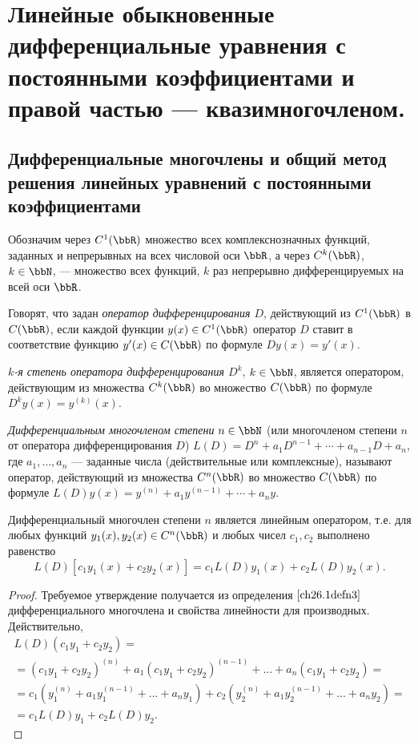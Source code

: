 \chapter{Линейные обыкновенные дифференциальные уравнения с постоянными коэффициентами и правой частью — квазимногочленом.}
\section{Дифференциальные многочлены и общий метод решения линейных уравнений с постоянными коэффициентами}
Обозначим через $C^1(\bbR)$ множество всех комплекснозначных функций, заданных и непрерывных на всех числовой оси $\bbR$, а через $C^k(\bbR)$, $k\in \bbN$, --- множество всех функций, $k$ раз непрерывно дифференцируемых на всей оси $\bbR$.
\begin{defn} \label{ch26.1defn1}
Говорят, что задан \textit{оператор дифференцирования $D$}, действующий из $C^1(\bbR)$ в $C(\bbR)$, если каждой функции $y(x)\in C^1(\bbR)$ оператор $D$ ставит в соответствие функцию $y'(x) \in C(\bbR)$ по формуле $Dy(x)=y'(x)$.
\end{defn}

\begin{defn} \label{ch26.1defn2}
\textit{$k$-я степень оператора дифференцирования $D^k$}, $k\in \bbN$, является оператором, действующим из множества $C^k(\bbR)$ во множество $C(\bbR)$ по формуле $D^ky(x)=y^{(k)}(x)$.
\end{defn}

\begin{defn} \label{ch26.1defn3}
\textit{Дифференциальным многочленом степени} $n \in \bbN$ (или многочленом степени $n$ от оператора дифференцирования $D$) $L(D) = D^n + a_1D^{n-1}+\cdots+a_{n-1}D + a_n$, где $a_1, \dots , a_n$ --- заданные числа (действительные или комплексные), называют оператор, действующий из множества $C^n(\bbR)$ во множество $C(\bbR)$ по формуле $L(D)y(x)=y^{(n)}+a_1y^{(n-1)}+\cdots+a_ny.$
\end{defn}

\begin{lemm} \label{ch26lemm1.1}
Дифференциальный многочлен степени $n$ является линейным оператором, т.е. для любых функций $y_1(x),y_2(x)\in C^n(\bbR)$ и любых чисел $c_1,c_2$ выполнено равенство
$$
L(D)[c_1y_1(x)+c_2y_2(x)]=c_1L(D)y_1(x)+c_2L(D)y_2(x).
$$ 
\end{lemm}

\begin{proof}
Требуемое утверждение получается из определения $\ref{ch26.1defn3}$ дифференциального многочлена и свойства линейности для производных. Действительно,
\begin{multline*}
L(D)(c_1y_1+c_2y_2)=\\=(c_1y_1+c_2y_2)^{(n)}+a_1(c_1y_1+c_2y_2)^{(n-1)}+...+a_n(c_1y_1+c_2y_2)=\\=c_1(y_1^{(n)}+a_1y_1^{(n-1)}+...+a_ny_1)+c_2(y_2^{(n)}+a_1y_2^{(n-1)}+...+a_ny_2)=\\=c_1L(D)y_1+c_2L(D)y_2.
\end{multline*}
\end{proof}

